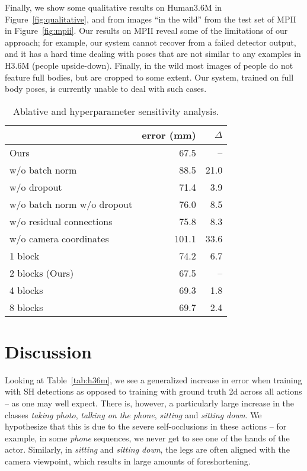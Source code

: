 \documentclass[10pt,twocolumn,letterpaper]{article}
\begin{document}
Finally, we show some qualitative results on Human3.6M in Figure~\ref{fig:qualitative}, and from images ``in the wild'' from the test set of MPII in Figure~\ref{fig:mpii}. Our results on MPII reveal some of the limitations of our approach; for example, our system cannot recover from a failed detector output, and it has a hard time dealing with poses that are not similar to any examples in H3.6M (\eg people upside-down).
Finally, in the wild most images of people do not feature full bodies, but are cropped to some extent. Our system, trained on full body poses, is currently unable to deal with such cases.

\begin{table}
\centering
\hspace{-3mm}
\begin{tabular}{@{}lrr@{}}
\toprule
 & error (mm) & $\Delta$\\
 \midrule
Ours & 67.5 & --\\
w/o batch norm & 88.5 & 21.0\\
w/o dropout & 71.4 & 3.9\\
w/o batch norm w/o dropout & 76.0 & 8.5\\
w/o residual connections&  75.8 & 8.3\\
w/o camera coordinates & 101.1 & 33.6\\
\midrule
1 block & 74.2 & 6.7\\
2 blocks (Ours) & 67.5 & --\\
4 blocks & 69.3 & 1.8\\
8 blocks & 69.7 & 2.4\\
\bottomrule
\end{tabular}
\vspace{3mm}
\caption{Ablative and hyperparameter sensitivity analysis.}
\label{tab:ablative}
\end{table}

\section{Discussion}

Looking at Table~\ref{tab:h36m}, we see a generalized increase in error when training with SH detections as opposed to training with ground truth 2d across all actions -- as one may well expect. There is, however, a particularly large increase in the classes \emph{taking photo}, \emph{talking on the phone}, \emph{sitting} and \emph{sitting down}. We hypothesize that this is due to the severe self-occlusions in these actions -- for example, in some \emph{phone} sequences, we never get to see one of the hands of the actor. Similarly, in \emph{sitting} and \emph{sitting down}, the legs are often aligned with the camera viewpoint, which results in large amounts of foreshortening.
\end{document}
